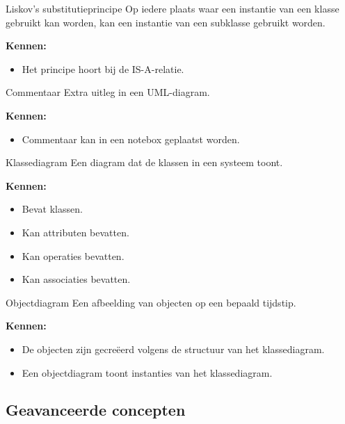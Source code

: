 \documentclass[11pt,a4paper]{article}
\begin{document}
\begin{definition}{Liskov's substitutieprincipe}
Op iedere plaats waar een instantie van een klasse gebruikt kan worden, kan een instantie van een subklasse gebruikt worden.

\textbf{Kennen:}
\begin{itemize}
    \item Het principe hoort bij de IS-A-relatie.
\end{itemize}
\end{definition}

\begin{definition}{Commentaar}
Extra uitleg in een UML-diagram.

\textbf{Kennen:}
\begin{itemize}
    \item Commentaar kan in een notebox geplaatst worden.
\end{itemize}
\end{definition}

\begin{definition}{Klassediagram}
Een diagram dat de klassen in een systeem toont.

\textbf{Kennen:}
\begin{itemize}
    \item Bevat klassen.
    \item Kan attributen bevatten.
    \item Kan operaties bevatten.
    \item Kan associaties bevatten.
\end{itemize}
\end{definition}

\begin{definition}{Objectdiagram}
Een afbeelding van objecten op een bepaald tijdstip.

\textbf{Kennen:}
\begin{itemize}
    \item De objecten zijn gecreëerd volgens de structuur van het klassediagram.
    \item Een objectdiagram toont instanties van het klassediagram.
\end{itemize}
\end{definition}

\subsection{Geavanceerde concepten}
\end{document}
